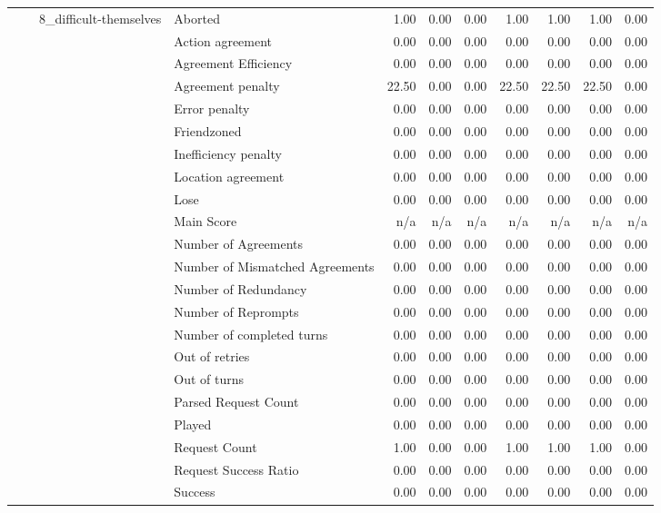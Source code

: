 \begin{tabular}{llllrrrrrrr}
\cline{3-11}
 &  & \multirow[t]{27}{*}{8_difficult-themselves} & Aborted & 1.00 & 0.00 & 0.00 & 1.00 & 1.00 & 1.00 & 0.00 \\
 &  &  & Action agreement & 0.00 & 0.00 & 0.00 & 0.00 & 0.00 & 0.00 & 0.00 \\
 &  &  & Agreement Efficiency & 0.00 & 0.00 & 0.00 & 0.00 & 0.00 & 0.00 & 0.00 \\
 &  &  & Agreement penalty & 22.50 & 0.00 & 0.00 & 22.50 & 22.50 & 22.50 & 0.00 \\
 &  &  & Error penalty & 0.00 & 0.00 & 0.00 & 0.00 & 0.00 & 0.00 & 0.00 \\
 &  &  & Friendzoned & 0.00 & 0.00 & 0.00 & 0.00 & 0.00 & 0.00 & 0.00 \\
 &  &  & Inefficiency penalty & 0.00 & 0.00 & 0.00 & 0.00 & 0.00 & 0.00 & 0.00 \\
 &  &  & Location agreement & 0.00 & 0.00 & 0.00 & 0.00 & 0.00 & 0.00 & 0.00 \\
 &  &  & Lose & 0.00 & 0.00 & 0.00 & 0.00 & 0.00 & 0.00 & 0.00 \\
 &  &  & Main Score & n/a & n/a & n/a & n/a & n/a & n/a & n/a \\
 &  &  & Number of Agreements & 0.00 & 0.00 & 0.00 & 0.00 & 0.00 & 0.00 & 0.00 \\
 &  &  & Number of Mismatched Agreements & 0.00 & 0.00 & 0.00 & 0.00 & 0.00 & 0.00 & 0.00 \\
 &  &  & Number of Redundancy & 0.00 & 0.00 & 0.00 & 0.00 & 0.00 & 0.00 & 0.00 \\
 &  &  & Number of Reprompts & 0.00 & 0.00 & 0.00 & 0.00 & 0.00 & 0.00 & 0.00 \\
 &  &  & Number of completed turns & 0.00 & 0.00 & 0.00 & 0.00 & 0.00 & 0.00 & 0.00 \\
 &  &  & Out of retries & 0.00 & 0.00 & 0.00 & 0.00 & 0.00 & 0.00 & 0.00 \\
 &  &  & Out of turns & 0.00 & 0.00 & 0.00 & 0.00 & 0.00 & 0.00 & 0.00 \\
 &  &  & Parsed Request Count & 0.00 & 0.00 & 0.00 & 0.00 & 0.00 & 0.00 & 0.00 \\
 &  &  & Played & 0.00 & 0.00 & 0.00 & 0.00 & 0.00 & 0.00 & 0.00 \\
 &  &  & Request Count & 1.00 & 0.00 & 0.00 & 1.00 & 1.00 & 1.00 & 0.00 \\
 &  &  & Request Success Ratio & 0.00 & 0.00 & 0.00 & 0.00 & 0.00 & 0.00 & 0.00 \\
 &  &  & Success & 0.00 & 0.00 & 0.00 & 0.00 & 0.00 & 0.00 & 0.00 \\

\end{tabular}
